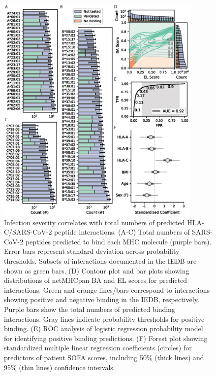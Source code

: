 \documentclass[utf8]{frontiersinFPHY_FAMS} %
\begin{document}
\begin{figure}[h!]
\begin{center}
\includegraphics[width=10cm]{Figure1}%
\end{center}
\caption{Infection severity correlates with total numbers of predicted HLA-C/SARS-CoV-2 peptide interactions. (A-C) Total numbers of SARS-CoV-2 peptides predicted to bind each MHC molecule (purple bars). Error bars represent standard deviation across probability thresholds. Subsets of interactions documented in the IEDB are shown as green bars. (D) Contour plot and bar plots showing distributions of netMHCpan BA and EL scores for predicted interactions. Green and orange lines/bars correspond to interactions showing positive and negative binding in the IEDB, respectively. Purple bars show the total numbers of predicted binding interactions. Gray lines indicate probability thresholds for positive binding. (E) ROC analysis of logistic regression probability model for identifying positive binding predictions. (F) Forest plot showing standardized multiple linear regression coefficients (circles) for predictors of patient SOFA scores, including 50\% (thick lines) and 95\% (thin lines) confidence intervals.}\label{fig:1}
\end{figure}
\end{document}
